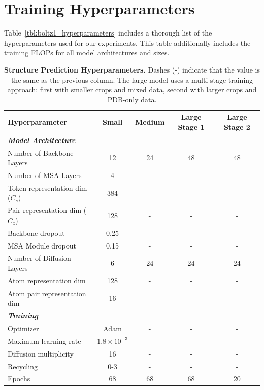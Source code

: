 \documentclass{article} %
\newcommand{\reftbl}[1]{Table~\ref{tbl:#1}}
\begin{document}
\section{Training Hyperparameters}
\reftbl{boltz1_hyperparameters} includes a thorough list of the hyperparameters used for our experiments.
This table additionally includes the training FLOPs for all model architectures and sizes.


\begin{table}[t]
\centering
\caption{
\textbf{Structure Prediction Hyperparameters.}
Dashes (-) indicate that the value is the same as the previous column.
The large model uses a multi-stage training approach: first with smaller crops and mixed data, second with larger crops and PDB-only data.
}
\vspace{-1em}
\setlength{\tabcolsep}{0.3em}
\renewcommand{\arraystretch}{1.2}
\small
\begin{tabular}{@{}lcccc@{}}
\toprule
\textbf{Hyperparameter} & Small & Medium & Large Stage 1 & Large Stage 2 \\
\midrule
\multicolumn{5}{l}{\textit{\textbf{Model Architecture}}} \\
\midrule
Number of Backbone Layers       & 12  & 24 & 48 & 48 \\
Number of MSA Layers            & 4   & -  & -  & -  \\
Token representation dim ($C_s$) & 384 & -  & -  & -  \\
Pair representation dim ($C_z$) & 128 & -  & -  & -  \\
Backbone dropout                & 0.25 & -  & -  & -  \\
MSA Module dropout              & 0.15 & -  & -  & -  \\
Number of Diffusion Layers      & 6   & 24 & 24 & 24 \\
Atom representation dim         & 128 & -  & -  & -  \\
Atom pair representation dim    & 16  & -  & -  & -  \\
\midrule
\multicolumn{5}{l}{\textit{\textbf{Training}}} \\
\midrule
Optimizer              & Adam & - & - & - \\
Maximum learning rate  & $1.8 \times 10^{-3}$ & - & - & - \\
Diffusion multiplicity & 16 & - & - & - \\
Recycling              & 0-3 & - & - & - \\
Epochs                 & 68  & 68 & 68 & 20 \\

\end{tabular}
\end{table}
\end{document}
